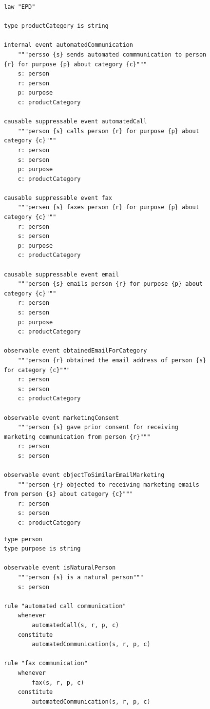 \lstset{language=Lex, style=mystyle}

\begin{figure}
\begin{minipage}{0.6\textwidth}
\begin{lstlisting}
law "EPD"

type productCategory is string

internal event automatedCommunication
    """persso {s} sends automated commmunication to person {r} for purpose {p} about category {c}"""
    s: person
    r: person
    p: purpose
    c: productCategory

causable suppressable event automatedCall
    """person {s} calls person {r} for purpose {p} about category {c}"""
    r: person 
    s: person
    p: purpose
    c: productCategory

causable suppressable event fax
    """persen {s} faxes person {r} for purpose {p} about category {c}"""
    r: person 
    s: person
    p: purpose
    c: productCategory

causable suppressable event email
    """person {s} emails person {r} for purpose {p} about category {c}"""
    r: person 
    s: person
    p: purpose
    c: productCategory

observable event obtainedEmailForCategory
    """person {r} obtained the email address of person {s} for category {c}"""
    r: person
    s: person
    c: productCategory

observable event marketingConsent
    """person {s} gave prior consent for receiving marketing communication from person {r}"""
    r: person
    s: person

observable event objectToSimilarEmailMarketing
    """person {r} objected to receiving marketing emails from person {s} about category {c}"""
    r: person
    s: person
    c: productCategory
\end{lstlisting}
\end{minipage}
\hspace{10pt}
\begin{minipage}{0.6\textwidth}
\begin{lstlisting}[firstnumber=51]
type person
type purpose is string

observable event isNaturalPerson
    """person {s} is a natural person"""
    s: person

rule "automated call communication"
    whenever
        automatedCall(s, r, p, c)
    constitute
        automatedCommunication(s, r, p, c)

rule "fax communication"
    whenever
        fax(s, r, p, c)
    constitute
        automatedCommunication(s, r, p, c)


\end{lstlisting}
\end{minipage}
\end{figure}
